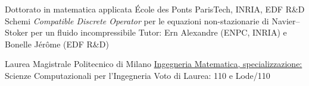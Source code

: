 \documentclass[italian]{RMcv}
\begin{document}






%
%


%
        {Dottorato in matematica applicata}%
        {\'Ecole des Ponts ParisTech, INRIA, EDF R\&D}%
        {\noindent Schemi \emph{Compatible Discrete Operator} per le equazioni non-stazionarie di Navier--Stoker per un fluido incompressibile}%
        {Tutor: Ern Alexandre (ENPC, INRIA) e Bonelle J\'er\^ome (EDF R\&D)}%

%
        {Laurea Magistrale}%
        {Politecnico di Milano}%
        {\href{https://www.politesi.polimi.it/handle/10589/133692}{Ingegneria Matematica, specializzazione:} Scienze Computazionali per l'Ingegneria}%
        {Voto di Laurea: 110 e Lode/110}
\end{document}
